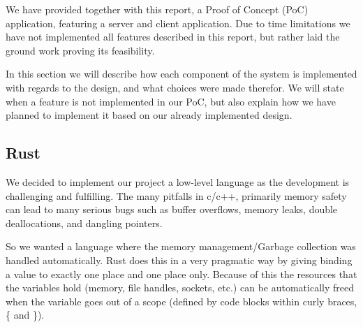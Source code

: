 
We have provided together with this report, a Proof of Concept (PoC)
application, featuring a server and client application. Due to time
limitations we have not implemented all features described in this
report, but rather laid the ground work proving its feasibility.

In this section we will describe how each component of the system is
implemented with regards to the design, and what choices were made
therefor. We will state when a feature is not implemented in our PoC,
but also explain how we have planned to implement it based on our
already implemented design.


\subsection{Rust}
We decided to implement our project a low-level language as the
development is challenging and fulfilling. The many pitfalls in c/c++,
primarily memory safety can lead to many serious bugs such as buffer
overflows, memory leaks, double deallocations, and dangling pointers.

So we wanted a language where the memory management/Garbage collection
was handled automatically. Rust does this in a very pragmatic way by
giving binding a value to exactly one place and one place
only. Because of this the resources that the variables hold (memory,
file handles, sockets, etc.) can be automatically freed when the
variable goes out of a scope (defined by code blocks within curly
braces, \{ and \}).


